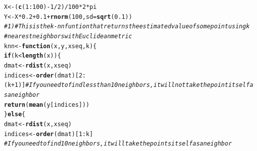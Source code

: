 \documentclass{article}\usepackage[]{graphicx}\usepackage[]{color}
\makeatletter
\newcommand{\hlnum}[1]{\textcolor[rgb]{0.686,0.059,0.569}{#1}}%
\newcommand{\hlcom}[1]{\textcolor[rgb]{0.678,0.584,0.686}{\textit{#1}}}%
\newcommand{\hlopt}[1]{\textcolor[rgb]{0,0,0}{#1}}%
\newcommand{\hlstd}[1]{\textcolor[rgb]{0.345,0.345,0.345}{#1}}%
\newcommand{\hlkwa}[1]{\textcolor[rgb]{0.161,0.373,0.58}{\textbf{#1}}}%
\newcommand{\hlkwb}[1]{\textcolor[rgb]{0.69,0.353,0.396}{#1}}%
\newcommand{\hlkwc}[1]{\textcolor[rgb]{0.333,0.667,0.333}{#1}}%
\newcommand{\hlkwd}[1]{\textcolor[rgb]{0.737,0.353,0.396}{\textbf{#1}}}%
\newenvironment{kframe}{%
 \def\at@end@of@kframe{}%
 \ifinner\ifhmode%
  \def\at@end@of@kframe{\end{minipage}}%
  \begin{minipage}{\columnwidth}%
 \fi\fi%
 \def\FrameCommand##1{\hskip\@totalleftmargin \hskip-\fboxsep
 \colorbox{shadecolor}{##1}\hskip-\fboxsep
     \hskip-\linewidth \hskip-\@totalleftmargin \hskip\columnwidth}%
 \MakeFramed {\advance\hsize-\width
   \@totalleftmargin\z@ \linewidth\hsize
   \@setminipage}}%
 {\par\unskip\endMakeFramed%
 \at@end@of@kframe}
\newenvironment{knitrout}{}{} %
\makeatother
\begin{document}
\begin{knitrout}
\begin{kframe}
{\ttfamily\noindent\itshape\color{messagecolor}{\#\# Loading required package: fields\\\#\# Loading required package: spam\\\#\# Loading required package: grid\\\#\# Spam version 0.40-0 (2013-09-11) is loaded.\\\#\# Type 'help( Spam)' or 'demo( spam)' for a short introduction \\\#\# and overview of this package.\\\#\# Help for individual functions is also obtained by adding the\\\#\# suffix '.spam' to the function name, e.g. 'help( chol.spam)'.\\\#\# \\\#\# Attaching package: 'spam'\\\#\# \\\#\# 下列对象被屏蔽了from 'package:base':\\\#\# \\\#\#\ \ \ \  backsolve, forwardsolve\\\#\# \\\#\# Loading required package: maps}}\begin{alltt}
\hlstd{X} \hlkwb{<-} \hlstd{(}\hlkwd{c}\hlstd{(}\hlnum{1}\hlopt{:}\hlnum{100}\hlstd{)} \hlopt{-} \hlnum{1}\hlopt{/}\hlnum{2}\hlstd{)}\hlopt{/}\hlnum{100} \hlopt{*} \hlnum{2} \hlopt{*} \hlstd{pi}
\hlstd{Y} \hlkwb{<-} \hlstd{X} \hlopt{*} \hlnum{0.2} \hlopt{+} \hlnum{0.1} \hlopt{+} \hlkwd{rnorm}\hlstd{(}\hlnum{100}\hlstd{,} \hlkwc{sd} \hlstd{=} \hlkwd{sqrt}\hlstd{(}\hlnum{0.1}\hlstd{))}
\hlcom{# 1) # This is the k-nn funtion that returns the estimated value of some point using k}
\hlcom{# nearest neighbors with Euclidean metric}
\hlstd{knn} \hlkwb{<-} \hlkwa{function}\hlstd{(}\hlkwc{x}\hlstd{,} \hlkwc{y}\hlstd{,} \hlkwc{xseq}\hlstd{,} \hlkwc{k}\hlstd{) \{}
    \hlkwa{if} \hlstd{(k} \hlopt{<} \hlkwd{length}\hlstd{(x)) \{}
        \hlstd{dmat} \hlkwb{<-} \hlkwd{rdist}\hlstd{(x, xseq)}
        \hlstd{indices} \hlkwb{<-} \hlkwd{order}\hlstd{(dmat)[}\hlnum{2}\hlopt{:}\hlstd{(k} \hlopt{+} \hlnum{1}\hlstd{)]}  \hlcom{# If you need to find less than 10 neighbors, it will not take the point itself as a neighbor}
        \hlkwd{return}\hlstd{(}\hlkwd{mean}\hlstd{(y[indices]))}
    \hlstd{\}} \hlkwa{else} \hlstd{\{}
        \hlstd{dmat} \hlkwb{<-} \hlkwd{rdist}\hlstd{(x, xseq)}
        \hlstd{indices} \hlkwb{<-} \hlkwd{order}\hlstd{(dmat)[}\hlnum{1}\hlopt{:}\hlstd{k]}
        \hlcom{# If you need to find 10 neighbors, it will take the points itself as a neighbor}

\end{alltt}
\end{kframe}
\end{knitrout}
\end{document}
